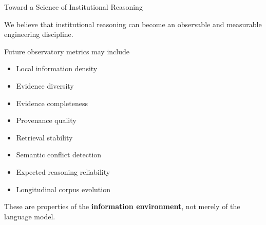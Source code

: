 \documentclass[aspectratio=169]{beamer}
\begin{document}

\begin{frame}{Toward a Science of Institutional Reasoning}

We believe that institutional reasoning can become an
observable and measurable engineering discipline.

\vspace{0.45cm}

Future observatory metrics may include

\begin{itemize}
\item Local information density
\item Evidence diversity
\item Evidence completeness
\item Provenance quality
\item Retrieval stability
\item Semantic conflict detection
\item Expected reasoning reliability
\item Longitudinal corpus evolution
\end{itemize}

\vspace{0.45cm}

These are properties of the
\textbf{information environment},
not merely of the language model.

\end{frame}

\end{document}

